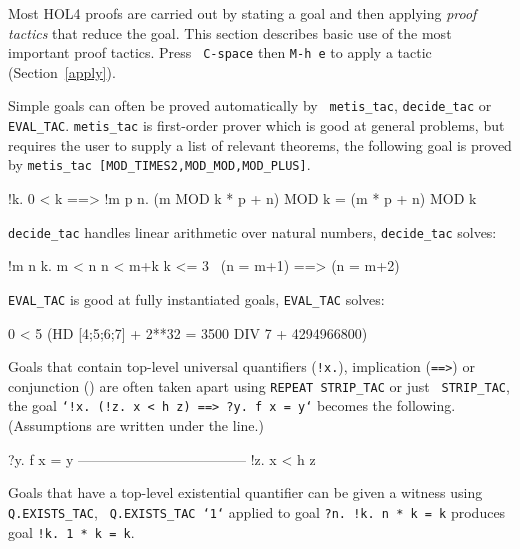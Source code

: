 \documentclass[a4paper,10pt]{article}
\begin{document}

Most HOL4 proofs are carried out by stating a goal and then applying
\emph{proof tactics} that reduce the goal.  This section describes
basic use of the most important proof tactics.  Press {\tt\small
  C-space} then {\tt\small M-h e} to apply a tactic
(Section~\ref{apply}).



Simple goals can often be proved automatically by {\tt\small
  metis\_tac}, {\tt\small decide\_tac} or {\tt\small EVAL\_TAC}.
{\tt\small metis\_tac} is first-order prover which is good at general
problems, but requires the user to supply a list of relevant theorems,
\eg{} the following goal is proved by {\tt\small metis\_tac
  [MOD\_TIMES2,MOD\_MOD,MOD\_PLUS]}.
\begin{code}
!k. 0 < k ==> !m p n. (m MOD k * p + n) MOD k = (m * p + n) MOD k
\end{code}

\noindent
{\tt\small decide\_tac} handles linear arithmetic over natural
numbers, \eg{} {\tt\small decide\_tac} solves:
\begin{code}
!m n k. m < n \conj{} n < m+k \conj{} k <= 3 \conj{} ~(n = m+1) ==> (n = m+2)
\end{code}
{\tt\small EVAL\_TAC} is good at fully instantiated goals, \eg{} {\tt\small EVAL\_TAC} solves:
\begin{code}
0 < 5 \conj{} (HD [4;5;6;7] + 2**32 = 3500 DIV 7 + 4294966800)
\end{code}


Goals that contain top-level universal quantifiers ({\tt !x.}),
implication ({\tt ==>}) or conjunction ({\tt \conj{}}) are often
taken apart using {\tt\small REPEAT STRIP\_TAC} or just {\tt\small
  STRIP\_TAC}, \eg{} the goal {\tt\small `!x{.}~(!z{.}~x < h z) ==> ?y{.}~f x = y`}
becomes the following. (Assumptions are written under the line.)
\begin{code}
    ?y. f x = y
    ------------------------------------
      !z. x < h z
\end{code}


Goals that have a top-level existential quantifier can be given a
witness using {\tt \small Q.EXISTS\_TAC}, \eg{} {\tt \small
  Q.EXISTS\_TAC `1`} applied to goal {\tt \small ?n{.}~!k{.}~n * k = k}
produces goal {\tt \small !k{.}~1 * k = k}.
\end{document}

